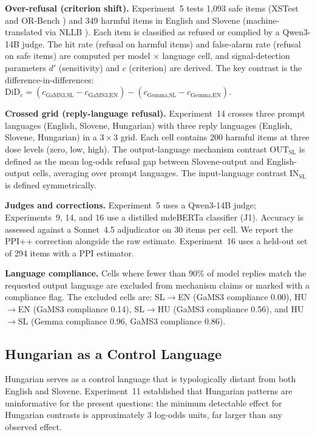 \documentclass[11pt,letterpaper]{article}
\begin{document}
\textbf{Over-refusal (criterion shift).} Experiment~5 tests 1,093 safe items (XSTest \citep{Rottger2023} and OR-Bench \citep{Cui2024}) and 349 harmful items in English and Slovene (machine-translated via NLLB \citep{Costajussa2022}). Each item is classified as refused or complied by a Qwen3-14B judge. The hit rate (refusal on harmful items) and false-alarm rate (refusal on safe items) are computed per model $\times$ language cell, and signal-detection parameters $d'$ (sensitivity) and $c$ (criterion) are derived. The key contrast is the difference-in-differences: $\text{DiD}_c = (c_{\text{GaMS3,SL}} - c_{\text{GaMS3,EN}}) - (c_{\text{Gemma,SL}} - c_{\text{Gemma,EN}})$.

\textbf{Crossed grid (reply-language refusal).} Experiment~14 crosses three prompt languages (English, Slovene, Hungarian) with three reply languages (English, Slovene, Hungarian) in a $3 \times 3$ grid. Each cell contains 200 harmful items at three dose levels (zero, low, high). The output-language mechanism contrast $\text{OUT}_{\text{SL}}$ is defined as the mean log-odds refusal gap between Slovene-output and English-output cells, averaging over prompt languages. The input-language contrast $\text{IN}_{\text{SL}}$ is defined symmetrically.

\textbf{Judges and corrections.} Experiment~5 uses a Qwen3-14B judge; Experiments~9, 14, and 16 use a distilled mdeBERTa classifier (J1). Accuracy is assessed against a Sonnet~4.5 adjudicator on 30 items per cell. We report the PPI++ correction \citep{Angelopoulos2023a} alongside the raw estimate. Experiment~16 uses a held-out set of 294 items with a PPI estimator.

\textbf{Language compliance.} Cells where fewer than 90\% of model replies match the requested output language are excluded from mechanism claims or marked with a compliance flag. The excluded cells are: SL$\to$EN (GaMS3 compliance 0.00), HU$\to$EN (GaMS3 compliance 0.14), SL$\to$HU (GaMS3 compliance 0.56), and HU$\to$SL (Gemma compliance 0.96, GaMS3 compliance 0.86).

\subsection{Hungarian as a Control Language}

Hungarian serves as a control language that is typologically distant from both English and Slovene. Experiment~11 established that Hungarian patterns are uninformative for the present questions: the minimum detectable effect for Hungarian contrasts is approximately 3 log-odds units, far larger than any observed effect.
\end{document}
